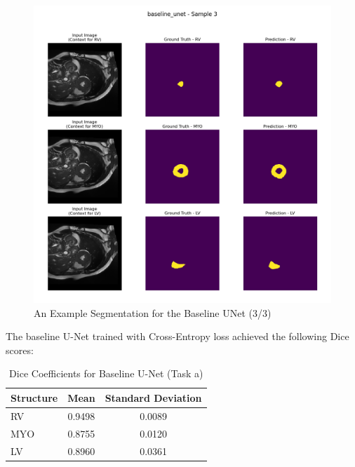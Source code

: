 \documentclass{article}
\begin{document}
\begin{figure}[H]
  \centering
  \includegraphics[width=\linewidth]{../result/baseline_unet/sample_3_segmentation.png}
  \caption{An Example Segmentation for the Baseline UNet (3/3)}
  \label{fig:baseline_unet_segmentation_example3}
\end{figure}

The baseline U-Net trained with Cross-Entropy loss achieved the following Dice scores:
\begin{table}[H]
  \centering
  \caption{Dice Coefficients for Baseline U-Net (Task a)}
  \label{tab:baseline_unet}
  \begin{tabular}{lcc}
    \toprule
    Structure & Mean   & Standard Deviation \\
    \midrule
    RV        & 0.9498 & 0.0089             \\
    MYO       & 0.8755 & 0.0120             \\
    LV        & 0.8960 & 0.0361             \\
    \bottomrule
  \end{tabular}
\end{table}
\end{document}
